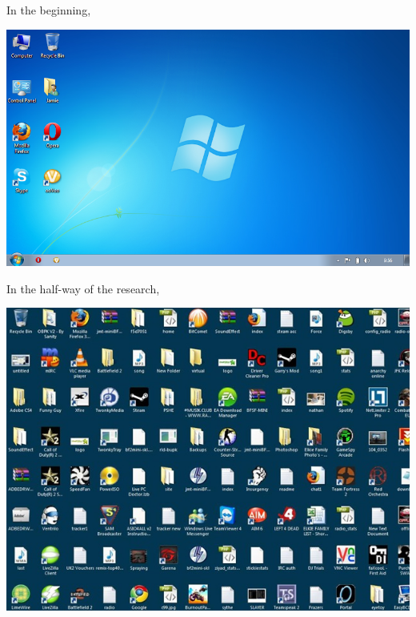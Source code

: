 \begin{frame}{\secname}
In the beginning, 
\begin{center}
		\includegraphics[scale=0.4]{image/desktop}
\end{center}
\end{frame}

\begin{frame}{\secname}
In the half-way of the research, \\
\begin{center}
		\includegraphics[scale=0.5]{image/messy-desktop}
\end{center}
\end{frame}

